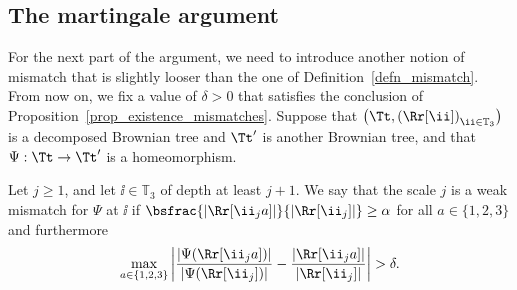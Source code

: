 \subsection{The martingale argument}\label{subsec:martingale}
For the next part of the argument, we need to introduce another notion of mismatch that is slightly looser than the one of Definition~\ref{defn_mismatch}.
From now on, we fix a value of $\delta>0$ that satisfies the conclusion of Proposition~\ref{prop_existence_mismatches}.
Suppose that $\left( \Tt, \left( \Rr[\ii] \right)_{\ii \in \mathbb T_3} \right)$ is a decomposed Brownian tree and $\Tt'$ is another Brownian tree, and that $\Psi:\Tt\rightarrow \Tt'$ is a homeomorphism.
\begin{definition}\label{defn:weak_mismatch}
Let $j \geq 1$, and let $\ii \in \mathbb{T}_3$ of depth at least $j+1$. We say that the scale $j$ is a weak mismatch for $\Psi$ at $\ii$ if $\bsfrac{\left| \Rr[\ii_j a] \right|}{\left| \Rr[\ii_j] \right|}\geq \alpha$ for all $a \in \{1,2,3\}$ and furthermore\vspace*{-3pt}
\[ \max_{a\in \{1,2,3\}} \left| \frac{|\Psi(\Rr[\ii_j a])|}{|\Psi(\Rr[\ii_j])|} - \frac{|\Rr[\ii_j a]|}{|\Rr[\ii_j]|} \right| > \delta. \]
\end{definition}

